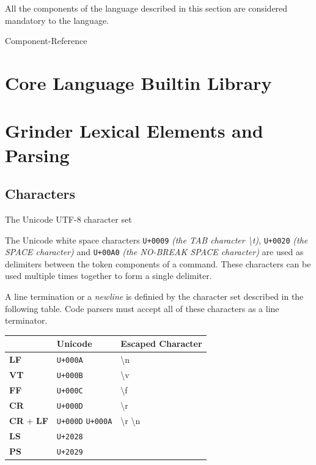 \documentclass [10pt]{article}
\begin{document}
All the components of the language described in this section are considered
mandatory to the language.

 {Component-Reference}

\newpage
\section {Core Language Builtin Library}


















\newpage
\section {Grinder Lexical Elements and Parsing}
\subsection {Characters}
The Unicode UTF-8 character set

The Unicode white space characters \texttt{U+0009}
\textit{(the TAB character \textbackslash t)}, \texttt{U+0020}
\textit{(the SPACE character)} and
\texttt{U+00A0} \textit{(the NO-BREAK SPACE character)} are used as delimiters
between the token components of a command. These characters can be used
multiple times together to form a single delimiter.

A line termination or a \textit{newline} is definied by the character set
described in the following table. Code parsers must accept all of these
characters as a line terminator.

\begin{center}
  \begin{tabular}{|l|l|l|}
  	\hline
  	                          & \textbf{Unicode}                & \textbf{Escaped Character}        \\ \hline
  	\textbf{LF}               & \texttt{U+000A}                 & \textbackslash n                  \\ \hline
  	\textbf{VT}               & \texttt{U+000B}                 & \textbackslash v                  \\ \hline
  	\textbf{FF}               & \texttt{U+000C}                 & \textbackslash f                  \\ \hline
  	\textbf{CR}               & \texttt{U+000D}                 & \textbackslash r                  \\ \hline
  	\textbf{CR} + \textbf{LF} & \texttt{U+000D} \texttt{U+000A} & \textbackslash r \textbackslash n \\ \hline
  	\textbf{LS}               & \texttt{U+2028}                 &  \\ \hline
  	\textbf{PS}               & \texttt{U+2029}                 &  \\ \hline
  \end{tabular}
\end{center}
\end{document}
